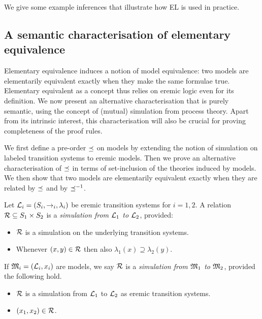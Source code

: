 We give some example inferences that illustrate how EL is used in
practice.  

\subsection{A semantic characterisation of elementary equivalence}\label{elementaryEquivalence}

Elementary equivalence induces a notion of model equivalence: two
models are elementarily equivalent exactly when they make the same
formulae true. Elementary equivalent as a concept thus relies on
eremic logic even for its definition. We now present an alternative
characterisation that is purely semantic, using the concept of
(mutual) simulation from process theory. Apart from its intrinsic
interest, this characterisation will also be crucial for proving
completeness of the proof rules.

We first define a pre-order $\preceq$ on models by extending the
notion of simulation on labeled transition systems to eremic
models. Then we prove an alternative characterisation of $\preceq$
in terms of set-inclusion of the theories induced by models. We then
show that two models are elementarily equivalent exactly when they are
related by $\preceq$ and by $\preceq^{-1}$.

\begin{definition}
Let $\mathcal{L}_i = (S_i, \rightarrow_i, \lambda_i)$ be eremic transition
systems for $i = 1, 2$.  A relation $\mathcal{R} \subseteq S_1 \times S_2$ is
a \emph{simulation from $\mathcal{L}_1$ to $\mathcal{L}_2$}, provided:
\begin{itemize} 

\item $\mathcal{R}$ is a simulation on the underlying transition systems. 

\item Whenever $(x, y) \in \mathcal{R}$ then also $\lambda_1(x) \supseteq
  \lambda_2(y)$.

\end{itemize}

\NI If $\frak{M}_i = (\mathcal{L}_i, x_i)$ are models, we say $\mathcal{R}$ is a
\emph{simulation from $\frak{M}_1$ to $\frak{M}_2$}, provided the following hold.

\begin{itemize}

\item $\mathcal{R}$ is a simulation from $\mathcal{L}_1$ to $\mathcal{L}_2$ as eremic transition systems.

\item  $(x_1, x_2) \in \mathcal{R}$. 

\end{itemize}

\end{definition}

